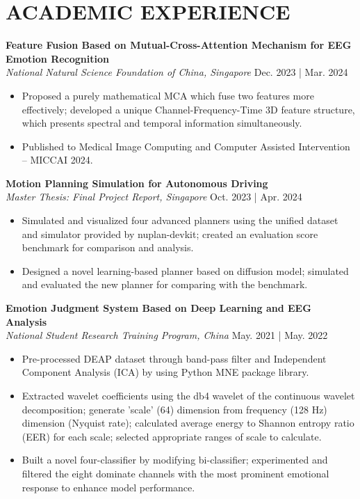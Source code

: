 \documentclass[a4paper,9pt]{extarticle}
\begin{document}
\nocite{*}



\section*{ACADEMIC EXPERIENCE}

\noindent
\textbf{Feature Fusion Based on Mutual-Cross-Attention Mechanism for EEG Emotion Recognition} \\ %
\textit{National Natural Science Foundation of China, Singapore} \hfill Dec. 2023 | Mar. 2024
\begin{itemize}
    \item Proposed a purely mathematical MCA which fuse two features more effectively; developed a unique Channel-Frequency-Time 3D feature structure, which presents spectral and temporal information simultaneously. 
    \item Published to Medical Image Computing and Computer Assisted Intervention -- MICCAI 2024.
\end{itemize}

\noindent
\textbf{Motion Planning Simulation for Autonomous Driving} \\ %
\textit{Master Thesis: Final Project Report, Singapore} \hfill Oct. 2023 | Apr. 2024 %
\begin{itemize}
    \item Simulated and visualized four advanced planners using the unified dataset and simulator provided by nuplan-devkit; created an evaluation score benchmark for comparison and analysis.
    \item Designed a novel learning-based planner based on diffusion model; simulated and evaluated the new planner for comparing with the benchmark.
\end{itemize}

\noindent
\textbf{Emotion Judgment System Based on Deep Learning and EEG Analysis} \\ %
\textit{National Student Research Training Program, China} \hfill May. 2021 | May. 2022 %
\begin{itemize}
    \item Pre-processed DEAP dataset through band-pass filter and Independent Component Analysis (ICA) by using Python MNE package library.
    \item Extracted wavelet coefficients using the db4 wavelet of the continuous wavelet decomposition; generate 'scale' (64) dimension from frequency (128 Hz) dimension (Nyquist rate); calculated average energy to Shannon entropy ratio (EER) for each scale; selected appropriate ranges of scale to calculate.
    \item Built a novel four-classifier by modifying bi-classifier; experimented and filtered the eight dominate channels with the most prominent emotional response to enhance model performance.
\end{itemize}
\end{document}
